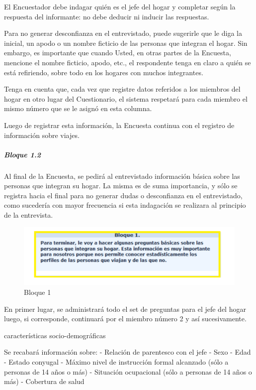 \documentclass[
  openany]{book}
\begin{document}
El Encuestador debe indagar quién es el jefe del hogar y completar según la respuesta del informante: no debe deducir ni inducir las respuestas.

Para no generar desconfianza en el entrevistado, puede sugerirle que le diga la inicial, un apodo o un nombre ficticio de las personas que integran el hogar. Sin embargo, es importante que cuando Usted, en otras partes de la Encuesta, mencione el nombre ficticio, apodo, etc., el respondente tenga en claro a quién se está refiriendo, sobre todo en los hogares con muchos integrantes.

Tenga en cuenta que, cada vez que registre datos referidos a los miembros del hogar en otro lugar del Cuestionario, el sistema respetará para cada miembro el mismo número que se le asignó en esta columna.

Luego de registrar esta información, la Encuesta continua con el registro de información sobre viajes.

\hypertarget{bloque-1.2}{%
\subparagraph{Bloque 1.2}\label{bloque-1.2}}

Al final de la Encuesta, se pedirá al entrevistado información básica sobre las personas que integran su hogar. La misma es de suma importancia, y sólo se registra hacia el final para no generar dudas o desconfianza en el entrevistado, como sucedería con mayor frecuencia si esta indagación se realizara al principio de la entrevista.

\begin{figure}

{\centering \includegraphics[width=1\linewidth]{imagenes/figura6-49} 

}

\caption{Bloque 1}\label{fig:bloque1}
\end{figure}

En primer lugar, se administrará todo el set de preguntas para el jefe del hogar luego, si corresponde, continuará por el miembro número 2 y así sucesivamente.

características socio-demográficas

Se recabará información sobre: - Relación de parentesco con el jefe - Sexo - Edad - Estado conyugal - Máximo nivel de instrucción formal alcanzado (sólo a personas de 14 años o más) - Situación ocupacional (sólo a personas de 14 años o más) - Cobertura de salud
\end{document}
